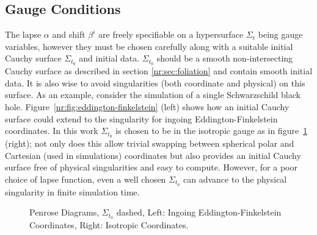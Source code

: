 \subsection{Gauge Conditions}\label{nr:sec:gaugeconditions}
The lapse $\alpha$ and shift $\beta^i$ are freely specifiable on a hypersurface $\Sigma_t$ being gauge variables, however they must be chosen carefully along with a suitable initial Cauchy surface $\Sigma_{t_0}$ and initial data. $\Sigma_{t_0}$ should be a smooth non-intersecting Cauchy surface as described in section \ref{nr:sec:foliation} and contain smooth initial data. It is also wise to avoid singularities (both coordinate and physical) on this surface. As an example, consider the simulation of a single Schwarzschild black hole. Figure~\ref{nr:fig:eddington-finkelstein} (left) shows how an initial Cauchy surface could extend to the singularity for ingoing Eddington-Finkelstein coordinates. In this work $\Sigma_{t_0}$ is chosen to be in the isotropic gauge as in figure~\ref{nr:fig:isotropic} (right); not only does this allow trivial swapping between spherical polar and Cartesian (used in simulations) coordinates but also provides an initial Cauchy surface free of physical singularities and easy to compute. However, for a poor choice of lapse function, even a well chosen $\Sigma_{t_0}$ can advance to the physical singularity in finite simulation time.

  \begin{figure}[h]
  \caption{Penrose Diagrams, $\Sigma_{t_0}$ dashed, Left: Ingoing Eddington-Finkelstein Coordinates, Right: Isotropic Coordinates.}
  \centering
   \label{nr:fig:eddington-finkelstein}
  \hfill
   \label{nr:fig:isotropic}
\end{figure}

